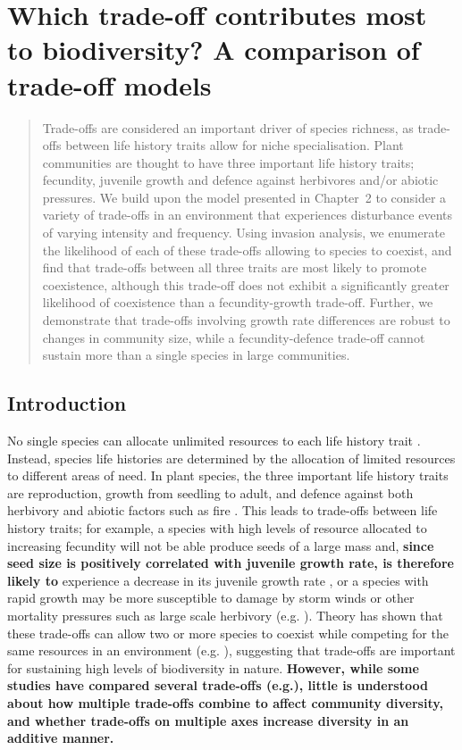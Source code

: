 \documentclass[preprint,10pt,reqno]{report}
\begin{document}
   \setcounter{chapter}{2}
\chapter{Which trade-off contributes most to biodiversity? A comparison of trade-off models}
\begin{abstract}
Trade-offs are considered an important driver of species richness, as trade-offs between life history traits allow for niche specialisation. Plant communities are thought to have three important life history traits; fecundity, juvenile growth and defence against herbivores and/or abiotic pressures. We build upon the model presented in Chapter~2 to consider a variety of trade-offs in an environment that experiences disturbance events of varying intensity and frequency. Using invasion analysis, we enumerate the likelihood of each of these trade-offs allowing to species to coexist, and find that trade-offs between all three traits are most likely to promote coexistence, although this trade-off does not exhibit a significantly greater likelihood of coexistence than a fecundity-growth trade-off. Further, we demonstrate that trade-offs involving growth rate differences are robust to changes in community size, while a fecundity-defence trade-off cannot sustain more than a single species in large communities. 
\end{abstract}

\section{Introduction}
No single species can allocate unlimited resources to each life history trait \cite{law1979optimal,tilman1982resource}. Instead, species life histories are determined by the allocation of limited resources to different areas of need. In plant species, the three important life history traits are reproduction, growth from seedling to adult, and defence against both herbivory and abiotic factors such as fire \cite{bazzaz1987allocating}. This leads to trade-offs between life history traits; for example, a species with high levels of resource allocated to increasing fecundity will not be able produce seeds of a large mass \cite{turnbull1999seed} and, \textbf{since seed size is positively correlated with juvenile growth rate, is therefore likely to} experience a decrease in its juvenile growth rate \cite{gross1984effects}, or a species with rapid growth may be more susceptible to damage by storm winds or other mortality pressures such as large scale herbivory (e.g. \cite{wright2010functional,fine2006growth}). Theory has shown that these trade-offs can allow two or more species to coexist while competing for  the same resources in an environment (e.g. \cite{kisdi2003coexistence,levins1971regional,bonsall2004life}), suggesting that trade-offs are important for sustaining high levels of biodiversity in nature. \textbf{However, while some studies have compared several trade-offs (e.g.\cite{tilman1990constraints,grime1977evidence}), little is understood about how multiple trade-offs combine to affect community diversity, and whether trade-offs on multiple axes increase diversity in an additive manner.}
\end{document}
